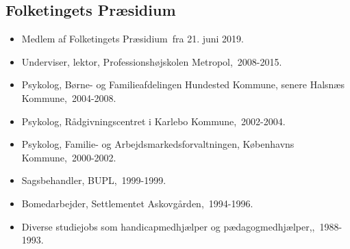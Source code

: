 \documentclass[11pt, a4paper]{awesome-cv}
\begin{document}
\begin{cvletter}
\subsection*{Folketingets Præsidium}
\begin{itemize}
\item Medlem af Folketingets Præsidium fra 21. juni 2019.
\end{itemize}
\begin{itemize}
\item Underviser, lektor, Professionshøjskolen Metropol, 2008-2015.
\item Psykolog, Børne- og Familieafdelingen Hundested Kommune, senere Halsnæs Kommune, 2004-2008.
\item Psykolog, Rådgivningscentret i Karlebo Kommune, 2002-2004.
\item Psykolog, Familie- og Arbejdsmarkedsforvaltningen, Københavns Kommune, 2000-2002.
\item Sagsbehandler, BUPL, 1999-1999.
\item Bomedarbejder, Settlementet Askovgården, 1994-1996.
\item Diverse studiejobs som handicapmedhjælper og pædagogmedhjælper,, 1988-1993.
\end{itemize}
\end{cvletter}
\end{document}
